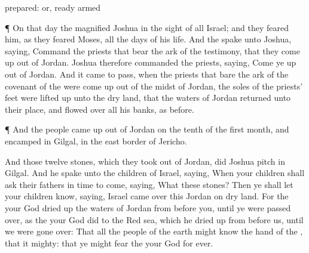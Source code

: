 {{prepared: or, ready armed}
\par }{\PP {}¶ On that
day the
{}
magnified
Joshua in the
sight of all
Israel; and they
feared him, as they
feared
Moses, all the
days of his
life.
And the
{}
spake unto
Joshua,
saying,
Command the
priests that
bear the
ark of the
testimony, that they come
up out of
Jordan.
Joshua therefore
commanded the
priests,
saying, Come ye
up out of
Jordan.
And it came to pass, when the
priests that
bare the
ark of the
covenant of the
{} were come
up out of the
midst of
Jordan,
{} the
soles of the
priests’
feet were lifted
up unto the dry
land, that the
waters of
Jordan
returned unto their
place, and
flowed over all his
banks,
as
{}
before.
\par }{\PP {}¶ And the
people came
up out of
Jordan on the
tenth
{} of the
first
month, and
encamped in
Gilgal, in the
east
border of
Jericho.
\par }{\PP {}And those
twelve
stones, which they took
out of
Jordan, did
Joshua
pitch in
Gilgal.
And he
spake unto the
children of
Israel,
saying, When your
children shall
ask their
fathers in time to
come,
saying, What
{} these
stones?
Then ye shall let your
children
know,
saying,
Israel came
over this
Jordan on dry
land.
For the
{} your
God dried
up the
waters of
Jordan from
before you, until ye were passed
over, as the
{} your
God
did to the
Red
sea, which he dried
up from
before us, until we were gone
over:
That all the
people of the
earth might
know the
hand of the
{}, that it
{}
mighty: that ye might
fear the
{} your
God for
ever.

}
